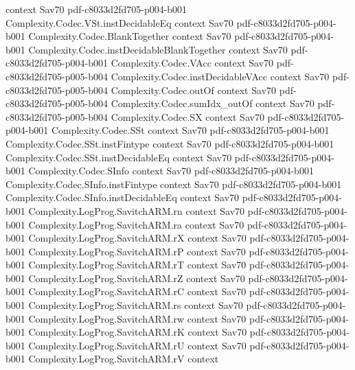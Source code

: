 \begin{theorem}
  {context}
  {Sav70}
  {pdf-c8033d2fd705-p004-b001}
\proofstep
  {Complexity.Codec.VSt.instDecidableEq}
  {context}
  {Sav70}
  {pdf-c8033d2fd705-p004-b001}
\proofstep
  {Complexity.Codec.BlankTogether}
  {context}
  {Sav70}
  {pdf-c8033d2fd705-p004-b001}
\proofstep
  {Complexity.Codec.instDecidableBlankTogether}
  {context}
  {Sav70}
  {pdf-c8033d2fd705-p004-b001}
\proofstep
  {Complexity.Codec.VAcc}
  {context}
  {Sav70}
  {pdf-c8033d2fd705-p005-b004}
\proofstep
  {Complexity.Codec.instDecidableVAcc}
  {context}
  {Sav70}
  {pdf-c8033d2fd705-p005-b004}
\proofstep
  {Complexity.Codec.outOf}
  {context}
  {Sav70}
  {pdf-c8033d2fd705-p005-b004}
\proofstep
  {Complexity.Codec.sumIdx_outOf}
  {context}
  {Sav70}
  {pdf-c8033d2fd705-p005-b004}
\proofstep
  {Complexity.Codec.SX}
  {context}
  {Sav70}
  {pdf-c8033d2fd705-p004-b001}
\proofstep
  {Complexity.Codec.SSt}
  {context}
  {Sav70}
  {pdf-c8033d2fd705-p004-b001}
\proofstep
  {Complexity.Codec.SSt.instFintype}
  {context}
  {Sav70}
  {pdf-c8033d2fd705-p004-b001}
\proofstep
  {Complexity.Codec.SSt.instDecidableEq}
  {context}
  {Sav70}
  {pdf-c8033d2fd705-p004-b001}
\proofstep
  {Complexity.Codec.SInfo}
  {context}
  {Sav70}
  {pdf-c8033d2fd705-p004-b001}
\proofstep
  {Complexity.Codec.SInfo.instFintype}
  {context}
  {Sav70}
  {pdf-c8033d2fd705-p004-b001}
\proofstep
  {Complexity.Codec.SInfo.instDecidableEq}
  {context}
  {Sav70}
  {pdf-c8033d2fd705-p004-b001}
\proofstep
  {Complexity.LogProg.SavitchARM.rn}
  {context}
  {Sav70}
  {pdf-c8033d2fd705-p004-b001}
\proofstep
  {Complexity.LogProg.SavitchARM.ra}
  {context}
  {Sav70}
  {pdf-c8033d2fd705-p004-b001}
\proofstep
  {Complexity.LogProg.SavitchARM.rX}
  {context}
  {Sav70}
  {pdf-c8033d2fd705-p004-b001}
\proofstep
  {Complexity.LogProg.SavitchARM.rP}
  {context}
  {Sav70}
  {pdf-c8033d2fd705-p004-b001}
\proofstep
  {Complexity.LogProg.SavitchARM.rT}
  {context}
  {Sav70}
  {pdf-c8033d2fd705-p004-b001}
\proofstep
  {Complexity.LogProg.SavitchARM.rZ}
  {context}
  {Sav70}
  {pdf-c8033d2fd705-p004-b001}
\proofstep
  {Complexity.LogProg.SavitchARM.rC}
  {context}
  {Sav70}
  {pdf-c8033d2fd705-p004-b001}
\proofstep
  {Complexity.LogProg.SavitchARM.rs}
  {context}
  {Sav70}
  {pdf-c8033d2fd705-p004-b001}
\proofstep
  {Complexity.LogProg.SavitchARM.rw}
  {context}
  {Sav70}
  {pdf-c8033d2fd705-p004-b001}
\proofstep
  {Complexity.LogProg.SavitchARM.rK}
  {context}
  {Sav70}
  {pdf-c8033d2fd705-p004-b001}
\proofstep
  {Complexity.LogProg.SavitchARM.rU}
  {context}
  {Sav70}
  {pdf-c8033d2fd705-p004-b001}
\proofstep
  {Complexity.LogProg.SavitchARM.rV}
  {context}

\end{theorem}
